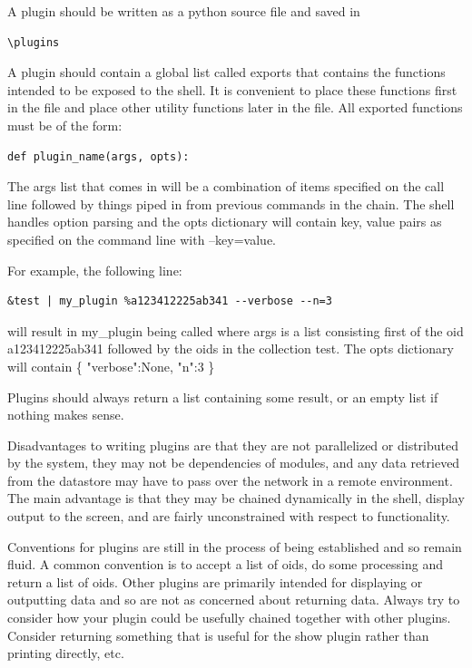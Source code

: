 \documentclass{book}
\begin{document}
A plugin should be written as a python source file and saved in  
\begin{verbatim}\plugins
\end{verbatim} 
A plugin should contain a global list called exports that contains the functions intended to be exposed to the shell.  It is convenient to place these functions first in the file and place other utility functions later in the file.  All exported functions must be of the form:
\begin{verbatim}def plugin_name(args, opts):
\end{verbatim}
The args list that comes in will be a combination of items specified on the call line followed by things piped in from previous commands in the chain.  The shell handles option parsing and the opts dictionary will contain key, value pairs as specified on the command line with --key=value. 

For example, the following line:
\begin{verbatim}&test | my_plugin %a123412225ab341 --verbose --n=3
\end{verbatim}
will result in my\_plugin being called where args is a list consisting first of the oid a123412225ab341 followed by the oids in the collection test.  The opts dictionary will contain \{ "verbose":None, "n":3 \}

Plugins should always return a list containing some result, or an empty list if nothing makes sense.

Disadvantages to writing plugins are that they are not parallelized or distributed by the system, they may not be dependencies of modules, and any data retrieved from the datastore may have to pass over the network in a remote environment.  The main advantage is that they may be chained dynamically in the shell, display output to the screen, and are fairly unconstrained with respect to functionality.

Conventions for plugins are still in the process of being established and so remain fluid.  A common convention is to accept a list of oids, do some processing and return a list of oids.  Other plugins are primarily intended for displaying or outputting data and so are not as concerned about returning data.  Always try to consider how your plugin could be usefully chained together with other plugins.  Consider returning something that is useful for the show plugin rather than printing directly, etc. 
\end{document}
